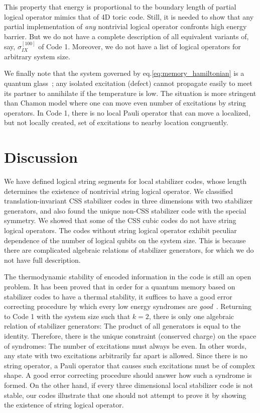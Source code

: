 \documentclass[letterpaper,10pt,pra,aps,showpacs,twocolumn]{revtex4-1}
\theoremstyle{definition} \newtheorem{defn}{Definition}
\theoremstyle{definition} \newtheorem{remark}{Remark}
\begin{document}
This property that energy is proportional to the boundary length of partial logical operator mimics that of 4D toric code. Still, it is needed to show that any partial implementation of \emph{any} nontrivial logical operator confronts high energy barrier. But we do not have a complete description of all equivalent variants of, say, $\sigma_{IX}^{[100]}$ of Code 1. Moreover, we do not have a list of logical operators for arbitrary system size.

We finally note that the system governed by eq.\eqref{eq:memory_hamiltonian} is a quantum glass~\cite{Chamon2005Quantum}; any isolated excitation (defect) cannot propagate easily to meet its partner to annihilate if the temperature is low. The situation is more stringent than Chamon model where one can move even number of excitations by string operators. In Code 1, there is no local Pauli operator that can move a localized, but not locally created, set of excitations to nearby location congruently.

\section{Discussion}
\label{section:discussion}

We have defined logical string segments for local stabilizer codes, whose length determines the existence of nontrivial string logical operator. We classified translation-invariant CSS stabilizer codes in three dimensions with two stabilizer generators, and also found the unique non-CSS stabilizer code with the special symmetry. We showed that some of the CSS cubic codes do not have string logical operators. The codes without string logical operator exhibit peculiar dependence of the number of logical qubits on the system size. This is because there are complicated algebraic relations of stabilizer generators, for which we do not have full description.

The thermodynamic stability of encoded information in the code is still an open problem. It has been proved that in order for a quantum memory based on stabilizer codes to have a thermal stability, it suffices to have a good error correcting procedure by which every low energy syndromes are \emph{good}~\cite{ChesiLossBravyiEtAl2009Thermodynamic}. Returning to Code 1 with the system size such that $k=2$, there is only one algebraic relation of stabilizer generators: The product of all generators is equal to the identity. Therefore, there is the unique constraint (conserved charge) on the space of syndromes: The number of excitations must always be even. In other words, any state with two excitations arbitrarily far apart is allowed. Since there is no string operator, a Pauli operator that causes such excitations must be of complex shape. A good error correcting procedure should answer how such a syndrome is formed. On the other hand, if every three dimensional local stabilizer code is not stable, our codes illustrate that one should not attempt to prove it by showing the existence of string logical operator.
\end{document}
